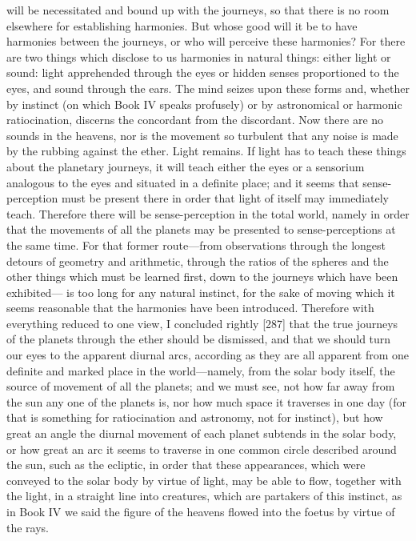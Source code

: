 \documentclass{article}
\begin{document}
will be necessitated and bound up with the journeys, so that there is no
room elsewhere for establishing harmonies. But whose good will it be to
have harmonies between the journeys, or who will perceive these
harmonies? For there are two things which disclose to us harmonies in
natural things: either light or sound: light apprehended through the eyes
or hidden senses proportioned to the eyes, and sound through the ears.
The mind seizes upon these forms and, whether by instinct (on which
Book IV speaks profusely) or by astronomical or harmonic ratiocination,
discerns the concordant from the discordant. Now there are no sounds in
the heavens, nor is the movement so turbulent that any noise is made by
the rubbing against the ether. Light remains. If light has to teach these
things about the planetary journeys, it will teach either the eyes or a
sensorium analogous to the eyes and situated in a definite place; and it
seems that sense-perception must be present there in order that light of
itself may immediately teach. Therefore there will be sense-perception in
the total world, namely in order that the movements of all the planets
may be presented to sense-perceptions at the same time. For that former
route—from observations through the longest detours of geometry and
arithmetic, through the ratios of the spheres and the other things which
must be learned first, down to the journeys which have been exhibited—
is too long for any natural instinct, for the sake of moving which it seems
reasonable that the harmonies have been introduced.
Therefore with everything reduced to one view, I concluded rightly [287]
that the true journeys of the planets through the ether should be
dismissed, and that we should turn our eyes to the apparent diurnal arcs,
according as they are all apparent from one definite and marked place in
the world—namely, from the solar body itself, the source of movement of
all the planets; and we must see, not how far away from the sun any one
of the planets is, nor how much space it traverses in one day (for that is
something for ratiocination and astronomy, not for instinct), but how
great an angle the diurnal movement of each planet subtends in the solar
body, or how great an arc it seems to traverse in one common circle
described around the sun, such as the ecliptic, in order that these
appearances, which were conveyed to the solar body by virtue of light,
may be able to flow, together with the light, in a straight line into
creatures, which are partakers of this instinct, as in Book IV we said the
figure of the heavens flowed into the foetus by virtue of the rays.
\end{document}
